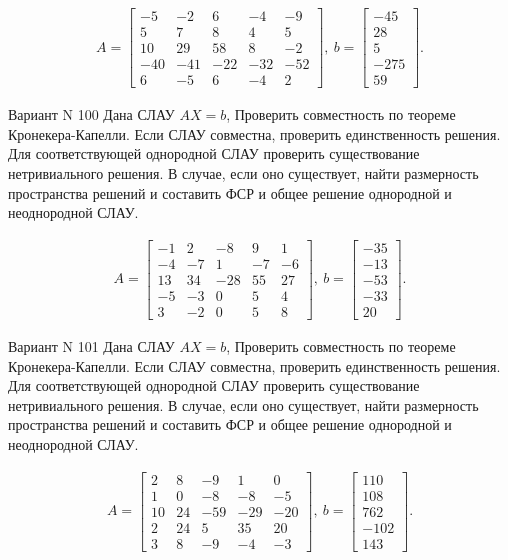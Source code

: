\documentclass[11pt]{report}
\begin{document}
\begin{align*}
 A = \left[\begin{matrix}-5 & -2 & 6 & -4 & -9\\5 & 7 & 8 & 4 & 5\\10 & 29 & 58 & 8 & -2\\-40 & -41 & -22 & -32 & -52\\6 & -5 & 6 & -4 & 2\end{matrix}\right],
\ b = \left[\begin{matrix}-45\\28\\5\\-275\\59\end{matrix}\right]. 
 \end{align*}

Вариант N 100
Дана СЛАУ $AX = b$,
Проверить совместность по теореме Кронекера-Капелли. Если СЛАУ совместна, проверить единственность решения.
Для соответствующей однородной СЛАУ проверить существование нетривиального решения. В случае, если оно существует,
найти размерность пространства решений и составить ФСР и общее решение однородной  и неоднородной СЛАУ.


\begin{align*}
 A = \left[\begin{matrix}-1 & 2 & -8 & 9 & 1\\-4 & -7 & 1 & -7 & -6\\13 & 34 & -28 & 55 & 27\\-5 & -3 & 0 & 5 & 4\\3 & -2 & 0 & 5 & 8\end{matrix}\right],
\ b = \left[\begin{matrix}-35\\-13\\-53\\-33\\20\end{matrix}\right]. 
 \end{align*}

Вариант N 101
Дана СЛАУ $AX = b$,
Проверить совместность по теореме Кронекера-Капелли. Если СЛАУ совместна, проверить единственность решения.
Для соответствующей однородной СЛАУ проверить существование нетривиального решения. В случае, если оно существует,
найти размерность пространства решений и составить ФСР и общее решение однородной  и неоднородной СЛАУ.


\begin{align*}
 A = \left[\begin{matrix}2 & 8 & -9 & 1 & 0\\1 & 0 & -8 & -8 & -5\\10 & 24 & -59 & -29 & -20\\2 & 24 & 5 & 35 & 20\\3 & 8 & -9 & -4 & -3\end{matrix}\right],
\ b = \left[\begin{matrix}110\\108\\762\\-102\\143\end{matrix}\right]. 
 \end{align*}
\end{document}
